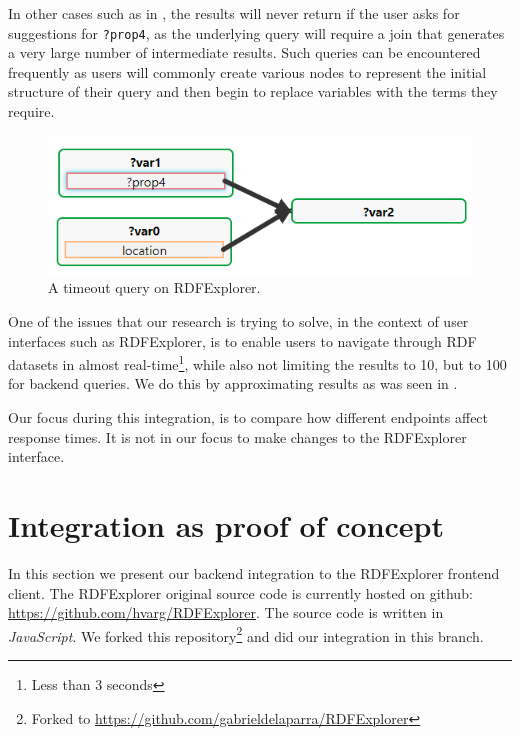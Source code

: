 In other cases such as in , the results will never return if the user asks for suggestions for \texttt{?prop4}, as the underlying query will require a join that generates a very large number of intermediate results. Such queries can be encountered frequently as users will commonly create various nodes to represent the initial structure of their query and then begin to replace variables with the terms they require. 

\begin{figure}[h]
    \centering
        \includegraphics[width=0.7\linewidth]{imagenes/timeout query.png}
        \caption{A timeout query on RDFExplorer.}
        \label{fig:rdfExplorer_timeout}
\end{figure}

One of the issues that our research is trying to solve, in the context of user interfaces such as RDFExplorer, is to enable users to navigate through RDF datasets in almost real-time\footnote{Less than 3 seconds}, while also not limiting the results to 10, but to 100 for backend queries. We do this by approximating results as was seen in .

Our focus during this integration, is to compare how different endpoints affect response times. It is not in our focus to make changes to the RDFExplorer interface.


\section{Integration as proof of concept}

In this section we present our backend integration to the RDFExplorer frontend client. The RDFExplorer original source code is currently hosted on github: \url{https://github.com/hvarg/RDFExplorer}. The source code is written in \textit{JavaScript}. We forked this repository\footnote{Forked to \url{https://github.com/gabrieldelaparra/RDFExplorer}} and did our integration in this branch. 


